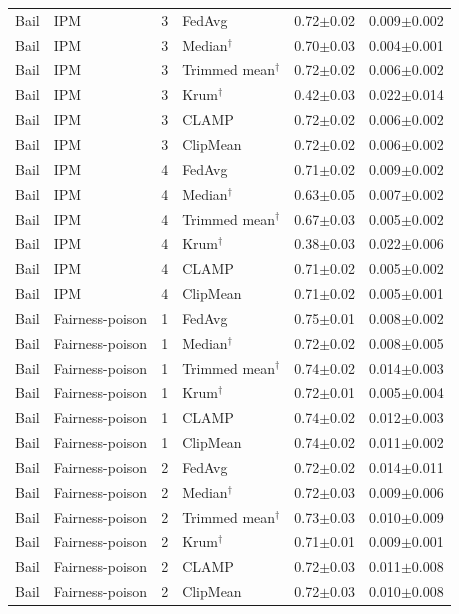 \begin{longtable}{llclcc}
Bail & IPM & 3 & FedAvg & 0.72$\pm$0.02 & 0.009$\pm$0.002 \\
Bail & IPM & 3 & Median$^\dagger$ & 0.70$\pm$0.03 & 0.004$\pm$0.001 \\
Bail & IPM & 3 & Trimmed mean$^\dagger$ & 0.72$\pm$0.02 & 0.006$\pm$0.002 \\
Bail & IPM & 3 & Krum$^\dagger$ & 0.42$\pm$0.03 & 0.022$\pm$0.014 \\
Bail & IPM & 3 & CLAMP & 0.72$\pm$0.02 & 0.006$\pm$0.002 \\
Bail & IPM & 3 & ClipMean & 0.72$\pm$0.02 & 0.006$\pm$0.002 \\
Bail & IPM & 4 & FedAvg & 0.71$\pm$0.02 & 0.009$\pm$0.002 \\
Bail & IPM & 4 & Median$^\dagger$ & 0.63$\pm$0.05 & 0.007$\pm$0.002 \\
Bail & IPM & 4 & Trimmed mean$^\dagger$ & 0.67$\pm$0.03 & 0.005$\pm$0.002 \\
Bail & IPM & 4 & Krum$^\dagger$ & 0.38$\pm$0.03 & 0.022$\pm$0.006 \\
Bail & IPM & 4 & CLAMP & 0.71$\pm$0.02 & 0.005$\pm$0.002 \\
Bail & IPM & 4 & ClipMean & 0.71$\pm$0.02 & 0.005$\pm$0.001 \\
Bail & Fairness-poison & 1 & FedAvg & 0.75$\pm$0.01 & 0.008$\pm$0.002 \\
Bail & Fairness-poison & 1 & Median$^\dagger$ & 0.72$\pm$0.02 & 0.008$\pm$0.005 \\
Bail & Fairness-poison & 1 & Trimmed mean$^\dagger$ & 0.74$\pm$0.02 & 0.014$\pm$0.003 \\
Bail & Fairness-poison & 1 & Krum$^\dagger$ & 0.72$\pm$0.01 & 0.005$\pm$0.004 \\
Bail & Fairness-poison & 1 & CLAMP & 0.74$\pm$0.02 & 0.012$\pm$0.003 \\
Bail & Fairness-poison & 1 & ClipMean & 0.74$\pm$0.02 & 0.011$\pm$0.002 \\
Bail & Fairness-poison & 2 & FedAvg & 0.72$\pm$0.02 & 0.014$\pm$0.011 \\
Bail & Fairness-poison & 2 & Median$^\dagger$ & 0.72$\pm$0.03 & 0.009$\pm$0.006 \\
Bail & Fairness-poison & 2 & Trimmed mean$^\dagger$ & 0.73$\pm$0.03 & 0.010$\pm$0.009 \\
Bail & Fairness-poison & 2 & Krum$^\dagger$ & 0.71$\pm$0.01 & 0.009$\pm$0.001 \\
Bail & Fairness-poison & 2 & CLAMP & 0.72$\pm$0.03 & 0.011$\pm$0.008 \\
Bail & Fairness-poison & 2 & ClipMean & 0.72$\pm$0.03 & 0.010$\pm$0.008 \\

\end{longtable}

